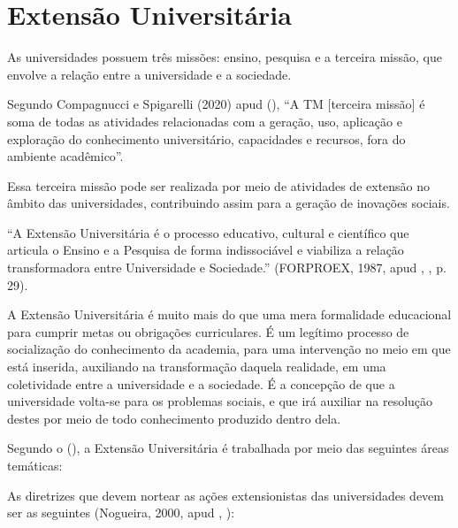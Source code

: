 \section {Extensão Universitária}
\label{extensaouniversitaria}

As universidades possuem três missões: ensino, pesquisa e a terceira missão, que envolve a relação entre a universidade e a sociedade. \cite{klaumann2023}

Segundo Compagnucci e Spigarelli (2020) apud \citeauthor{correa2021} (\citeyear{correa2021}), “A TM [terceira missão] é soma de todas as atividades relacionadas com a geração, uso, aplicação e exploração do conhecimento universitário, capacidades e recursos, fora do ambiente acadêmico”.

Essa terceira missão pode ser realizada por meio de atividades de extensão no âmbito das universidades, contribuindo assim para a geração de inovações sociais. \cite{klaumann2023}

“A Extensão Universitária é o processo educativo, cultural 
e científico que articula o Ensino e a Pesquisa de forma 
indissociável e viabiliza a relação transformadora entre 
Universidade e Sociedade.” (FORPROEX, 1987, apud \citeauthor{forproex2016}, \citeyear{forproex2016}, p. 29).

A Extensão Universitária é muito mais do que uma mera formalidade educacional para cumprir metas ou obrigações curriculares. É um legítimo processo de socialização do conhecimento da academia, para uma intervenção no meio em que está inserida, auxiliando na transformação daquela realidade, em uma coletividade entre a universidade e a sociedade. É a concepção de que a universidade volta-se para os problemas sociais, e que irá auxiliar na resolução destes por meio de todo conhecimento produzido dentro dela.

Segundo o \citeauthor{forproex2016} (\citeyear{forproex2016}), a Extensão Universitária é trabalhada por meio das seguintes áreas temáticas:



As diretrizes que devem nortear as ações extensionistas das universidades devem ser as seguintes (Nogueira, 2000, apud \citeauthor{forproex2016}, \citeyear{forproex2016}):

